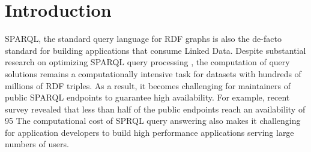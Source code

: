\section{Introduction}
SPARQL, the standard query language for RDF graphs is also the de-facto standard for building applications that consume Linked Data. 
Despite substantial research on optimizing SPARQL query processing \cite{Pham2013}, the computation of query solutions remains a computationally intensive task for datasets with hundreds of millions of RDF triples.
As a result, it becomes challenging for maintainers of public SPARQL endpoints to guarantee high availability.
For example, recent survey \cite{buil2013sparql}revealed that less than half of the public endpoints reach an availability of 95%
The computational cost of SPRQL query answering also makes it challenging for application developers to build high performance applications serving large numbers of users.